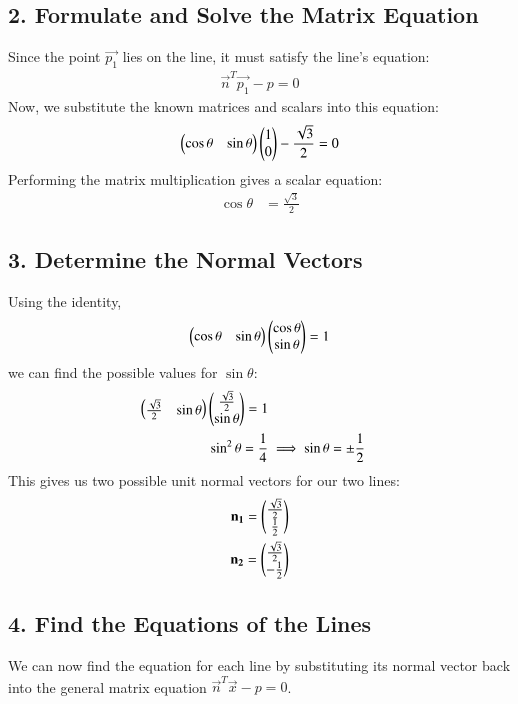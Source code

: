 \documentclass[journal]{IEEEtran}
\begin{document}
\subsection*{2. Formulate and Solve the Matrix Equation}

Since the point $\vec{p_1}$ lies on the line, it must satisfy the line's equation:
\begin{align}\vec{n}^T \vec{p_1} - p = 0\end{align}
Now, we substitute the known matrices and scalars into this equation:
\begin{align}
\begin{pmatrix}\cos\theta & \sin\theta \end{pmatrix} \begin{pmatrix}1 \\ 0\end{pmatrix} - \frac{\sqrt{3}}{2} = 0 \end{align}
Performing the matrix multiplication gives a scalar equation:
\begin{align}
\cos\theta &= \frac{\sqrt{3}}{2}
\end{align}

\subsection*{3. Determine the Normal Vectors}

Using the identity,
\begin{align}
    \begin{pmatrix}\cos\theta & \sin\theta\end{pmatrix}\begin{pmatrix}\cos\theta \\ \sin\theta\end{pmatrix}=1
\end{align}
 we can find the possible values for $\sin\theta$:
\begin{align}
\begin{pmatrix}\frac{\sqrt{3}}{2} & \sin\theta\end{pmatrix}\begin{pmatrix}\frac{\sqrt{3}}{2} \\ \sin\theta\end{pmatrix}=1\\
\sin^2\theta = \frac{1}{4} &\implies \sin\theta = \pm \frac{1}{2}
\end{align}
This gives us two possible unit normal vectors for our two lines:
\begin{align}
\mathbf{n_1} = \begin{pmatrix}\frac{\sqrt{3}}{2} \\ \frac{1}{2}\end{pmatrix}\\
\mathbf{n_2} = \begin{pmatrix}\frac{\sqrt{3}}{2} \\ -\frac{1}{2}\end{pmatrix}
\end{align}
\subsection*{4. Find the Equations of the Lines}

We can now find the equation for each line by substituting its normal vector back into the general matrix equation $\vec{n}^T \vec{x} - p = 0$.
\end{document}
